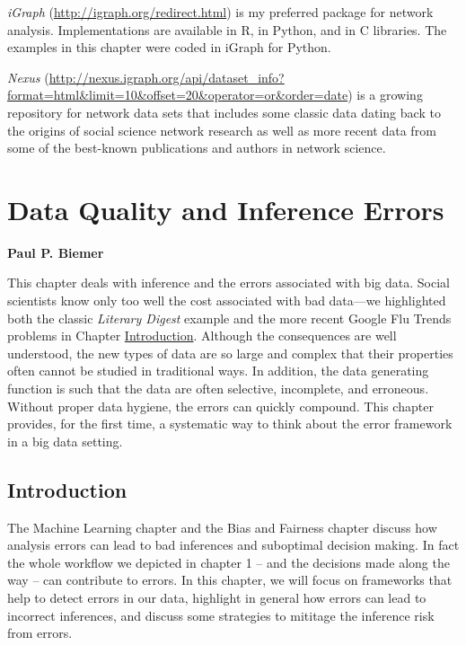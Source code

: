 \documentclass[]{krantz}
\begin{document}
\emph{iGraph} (\url{http://igraph.org/redirect.html}) is my preferred
package for network analysis. Implementations are available in R, in
Python, and in C libraries. The examples in this chapter were coded in
iGraph for Python.

\emph{Nexus}
(\url{http://nexus.igraph.org/api/dataset_info?format=html\&limit=10\&offset=20\&operator=or\&order=date})
is a growing repository for network data sets that includes some classic
data dating back to the origins of social science network research as
well as more recent data from some of the best-known publications and
authors in network science.

\chapter{Data Quality and Inference Errors}\label{chap:errors}

\textbf{Paul P. Biemer}

This chapter deals with inference and the errors associated with big
data. Social scientists know only too well the cost associated with bad
data---we highlighted both the classic \emph{Literary Digest} example
and the more recent Google Flu Trends problems in Chapter
\protect\hyperlink{chap:intro}{Introduction}. Although the consequences
are well understood, the new types of data are so large and complex that
their properties often cannot be studied in traditional ways. In
addition, the data generating function is such that the data are often
selective, incomplete, and erroneous. Without proper data hygiene, the
errors can quickly compound. This chapter provides, for the first time,
a systematic way to think about the error framework in a big data
setting.

\hypertarget{sec:10-1}{\section{Introduction}\label{sec:10-1}}

The Machine Learning chapter and the Bias and Fairness chapter discuss
how analysis errors can lead to bad inferences and suboptimal decision
making. In fact the whole workflow we depicted in chapter 1 -- and the
decisions made along the way -- can contribute to errors. In this
chapter, we will focus on frameworks that help to detect errors in our
data, highlight in general how errors can lead to incorrect inferences,
and discuss some strategies to mititage the inference risk from errors.
\end{document}
